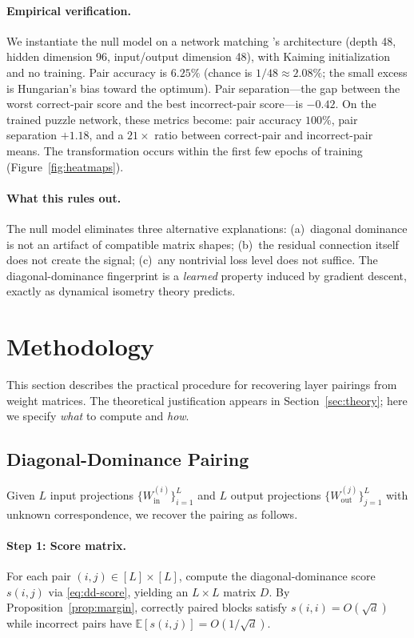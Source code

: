 \documentclass[wcp]{jmlr}
\begin{document}
\paragraph{Empirical verification.} We instantiate the null model on a network matching \citet{park2026}'s architecture (depth 48, hidden dimension 96, input/output dimension 48), with Kaiming initialization and no training. Pair accuracy is $6.25\%$ (chance is $1/48 \approx 2.08\%$; the small excess is Hungarian's bias toward the optimum). Pair separation---the gap between the worst correct-pair score and the best incorrect-pair score---is $-0.42$. On the trained puzzle network, these metrics become: pair accuracy $100\%$, pair separation $+1.18$, and a $21\times$ ratio between correct-pair and incorrect-pair means. The transformation occurs within the first few epochs of training (Figure~\ref{fig:heatmaps}).

\paragraph{What this rules out.} The null model eliminates three alternative explanations: (a)~diagonal dominance is not an artifact of compatible matrix shapes; (b)~the residual connection itself does not create the signal; (c)~any nontrivial loss level does not suffice. The diagonal-dominance fingerprint is a \emph{learned} property induced by gradient descent, exactly as dynamical isometry theory predicts.

\section{Methodology}\label{sec:method}

This section describes the practical procedure for recovering layer pairings from weight matrices. The theoretical justification appears in Section~\ref{sec:theory}; here we specify \emph{what} to compute and \emph{how}.

\subsection{Diagonal-Dominance Pairing}\label{sec:pairing}

Given $L$ input projections $\{W_{\mathrm{in}}^{(i)}\}_{i=1}^L$ and $L$ output projections $\{W_{\mathrm{out}}^{(j)}\}_{j=1}^L$ with unknown correspondence, we recover the pairing as follows.

\paragraph{Step 1: Score matrix.} For each pair $(i,j) \in [L] \times [L]$, compute the diagonal-dominance score $s(i,j)$ via \eqref{eq:dd-score}, yielding an $L \times L$ matrix $D$. By Proposition~\ref{prop:margin}, correctly paired blocks satisfy $s(i,i) = O(\sqrt{d})$ while incorrect pairs have $\mathbb{E}[s(i,j)] = O(1/\sqrt{d})$.
\end{document}
